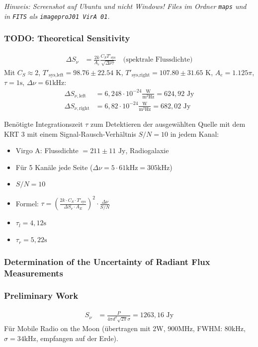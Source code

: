 \textit{Hinweis: Screenshot auf Ubuntu und nicht Windows! Files im Ordner \texttt{maps} und in \texttt{FITS} als \texttt{imageproJ01 VirA 01}.}

\subsubsection*{TODO: Theoretical Sensitivity}
\begin{align}
\Delta S_{\nu} &= \frac{2k}{A_{e}} \frac{C_{S}T'_{\text{sys}}}{\sqrt{\Delta \nu \tau}} \quad \text{(spektrale Flussdichte)}
\end{align}
Mit $C_{S} \approx 2$, $T'_{\text{sys,left}} = 98.76 \pm 22.54 \text{ K}$, $T'_{\text{sys,right}} = 107.80 \pm 31.65 \text{ K}$, $A_{e} = 1.125\pi$, $\tau = 1\text{s}$, $\Delta \nu = 61\text{kHz}$:
\begin{align}
\Delta S_{\nu,\text{left}} &= 6,248 \cdot 10^{-24} \frac{\text{W}}{\text{m}^2\text{Hz}} = 624,92 \text{ Jy} \\
\Delta S_{\nu,\text{right}} &= 6,82 \cdot 10^{-24} \frac{\text{W}}{\text{m}^2\text{Hz}} = 682,02 \text{ Jy}
\end{align}

Benötigte Integrationszeit $\tau$ zum Detektieren der ausgewählten Quelle mit dem KRT 3 mit einem Signal-Rausch-Verhältnis $S/N = 10$ in jedem Kanal:
\begin{itemize}
    \item Virgo A: Flussdichte $= 211 \pm 11 \text{ Jy}$, Radiogalaxie
    \item Für 5 Kanäle jede Seite ($\Delta \nu = 5 \cdot 61\text{kHz} = 305\text{kHz}$)
    \item $S/N = 10$
    \item Formel: $\tau = \left( \frac{2k\cdot C_{S}\cdot T'_{\text{sys}}}{\Delta S_{\nu}\cdot A_{E}} \right)^{2} \cdot \frac{\Delta\nu}{S/N}$
    \item $\tau_{l} = 4,12\text{s}$
    \item $\tau_{r} = 5,22\text{s}$
\end{itemize}

\subsubsection*{Determination of the Uncertainty of Radiant Flux Measurements}

\subsubsection*{Preliminary Work}
\begin{align}
S_{\nu} &= \frac{P}{4\pi d^2\sqrt{2\pi}\sigma} = 1263,16 \text{ Jy}
\end{align}
Für Mobile Radio on the Moon (übertragen mit 2W, 900MHz, FWHM: 80kHz, $\sigma = 34\text{kHz}$, empfangen auf der Erde).


